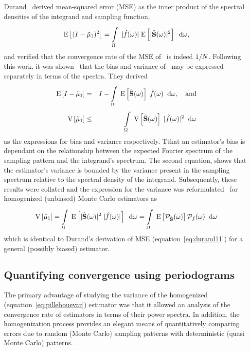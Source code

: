 Durand~\cite{durand2011frequency} derived mean-squared error (MSE) as the inner product of the spectral densities of the integrand and sampling function, 
\begin{equation} \label{eq:durand11}
   \mathrm{E} \left[(I-\tilde\mu_\mathrm{1})^2 \right] = \displaystyle\int\limits_{\Omega}^{} \; |\hat{f}(\omega)| \; \mathrm{E} \left[|\hat{\mathbf{S}}(\omega)|^2 \right] \;\; \mathrm{d}\omega,
\end{equation}
and verified that the convergence rate of the MSE of \estim{\N}\ is indeed $1/N$. Following this work, it was shown~\cite{SubrKautz} that the bias and variance of \ may be expressed separately in terms of the spectra. They derived
\begin{eqnarray}
  \mathrm{E} \left[I-\tilde\mu_\mathrm{1} \right] &=& I - \displaystyle\int\limits_{\Omega}^{} \; \mathrm{E} \left[\hat{\mathbf{S}}(\omega) \right] \; \hat{f}(\omega)  \;\; \mathrm{d}\omega, \quad \mathrm{and} \\
    \mathrm{V} \left[\tilde\mu_\mathrm{1}\right] &\leq& \displaystyle\int\limits_{\Omega}^{} \; \mathrm{V} \left[\hat{\mathbf{S}}(\omega)\right] \; |\hat{f}(\omega)|^2 \;\; \mathrm{d}\omega
\end{eqnarray}
as the expressions for bias and variance respectively. Tthat an estimator's bias is dependant on the relationship between the expected Fourier spectrum of the sampling pattern and the integrand's spectrum. The second equation, shows that the estimator's variance is bounded by the variance present in the sampling spectrum relative to the spectral density of the integrand. Subsequently, these results were collated and the expression for the variance was reformulated~\cite{Pilleboue:2015:VAM} for homogenized (unbiased) Monte Carlo estimators as
%
\begin{equation}
\mathrm{V} \left[\tilde\mu_\mathrm{1}\right] 
= \displaystyle\int\limits_{\Omega}^{} \; \mathrm{E} \left[|\hat{\mathbf{S}}(\omega)|^2\;|\hat{f}(\omega)|  \right] \;\; \mathrm{d}\omega 
= \displaystyle\int\limits_{\Omega}^{} \; \mathrm{E} \left[\mathcal{P}_{\hat{\mathbf{S}}}(\omega) \right] \mathcal{P}_{f}(\omega) \;\; \mathrm{d}\omega 
\end{equation}
which is identical to Durand's derivation of MSE (equation~\ref{eq:durand11}) for a general (possibly biased) estimator.
%

\subsection{Quantifying convergence using periodograms}
The primary advantage of studying the variance of the homogenized (equation~\ref{eq:pillebouevar}) estimator was that it allowed an analysis of the convergence rate of estimators in terms of their power spectra. In addition, the homogenization process provides an elegant means of quantitatively comparing errors due to random (Monte Carlo) sampling patterns with deterministic (quasi Monte Carlo) patterns.

\TBC